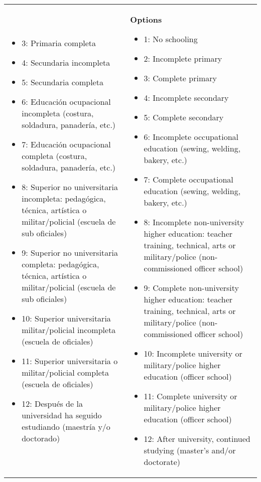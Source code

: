\documentclass[11pt]{article}
\begin{document}
\begin{longtable}{@{}LL@{}}
\begin{itemize}[leftmargin=*]
\item 3: Primaria completa
\item 4: Secundaria incompleta
\item 5: Secundaria completa
\item 6: Educación ocupacional incompleta (costura, soldadura, panadería, etc.)
\item 7: Educación ocupacional completa (costura, soldadura, panadería, etc.)
\item 8: Superior no universitaria incompleta: pedagógica, técnica, artística o militar/policial (escuela de sub oficiales)
\item 9: Superior no universitaria completa: pedagógica, técnica, artística o militar/policial (escuela de sub oficiales)
\item 10: Superior universitaria militar/policial incompleta (escuela de oficiales)
\item 11: Superior universitaria o militar/policial completa (escuela de oficiales)
\item 12: Después de la universidad ha seguido estudiando (maestría y/o doctorado)\end{itemize} & \textbf{Options}\par\begin{itemize}[leftmargin=*]\item 1: No schooling
\item 2: Incomplete primary
\item 3: Complete primary
\item 4: Incomplete secondary
\item 5: Complete secondary
\item 6: Incomplete occupational education (sewing, welding, bakery, etc.)
\item 7: Complete occupational education (sewing, welding, bakery, etc.)
\item 8: Incomplete non-university higher education: teacher training, technical, arts or military/police (non-commissioned officer school)
\item 9: Complete non-university higher education: teacher training, technical, arts or military/police (non-commissioned officer school)
\item 10: Incomplete university or military/police higher education (officer school)
\item 11: Complete university or military/police higher education (officer school)
\item 12: After university, continued studying (master's and/or doctorate)\end{itemize} \\

\end{longtable}
\end{document}
